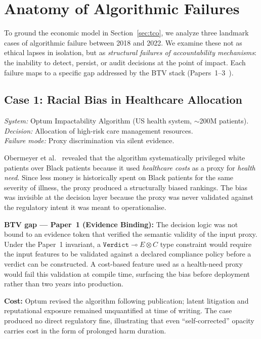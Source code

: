 \section{Anatomy of Algorithmic Failures}
\label{sec:cases}

To ground the economic model in Section~\ref{sec:tco}, we analyze three
landmark cases of algorithmic failure between 2018 and 2022. We examine
these not as ethical lapses in isolation, but as \emph{structural
failures of accountability mechanisms}: the inability to detect, persist,
or audit decisions at the point of impact. Each failure maps to a
specific gap addressed by the BTV stack (Papers~1--3~\cite{btv2026,btv-t-repo,btv-ar2026}).

\subsection{Case 1: Racial Bias in Healthcare Allocation}
\label{subsec:obermeyer}

\noindent\textit{System:} Optum Impactability Algorithm (US health system, $\sim$200M patients).\\
\textit{Decision:} Allocation of high-risk care management resources.\\
\textit{Failure mode:} Proxy discrimination via silent evidence.

Obermeyer et al.~\cite{obermeyer2019dissecting} revealed that the
algorithm systematically privileged white patients over Black patients
because it used \emph{healthcare costs} as a proxy for \emph{health
need}. Since less money is historically spent on Black patients for the
same severity of illness, the proxy produced a structurally biased
rankings. The bias was invisible at the decision layer because the
proxy was never validated against the regulatory intent it was meant to
operationalise.

\textbf{BTV gap --- Paper~1 (Evidence Binding):} The decision logic was
not bound to an evidence token that verified the semantic validity of the
input proxy. Under the Paper~1 invariant, a
$\texttt{Verdict} \multimap E \otimes C$ type constraint would require
the input features to be validated against a declared compliance policy
before a verdict can be constructed. A cost-based feature used as a
health-need proxy would fail this validation at compile time, surfacing
the bias before deployment rather than two years into production.

\textbf{Cost:} Optum revised the algorithm following publication;
latent litigation and reputational exposure remained unquantified at time
of writing. The case produced no direct regulatory fine, illustrating
that even ``self-corrected'' opacity carries cost in the form of
prolonged harm duration.

